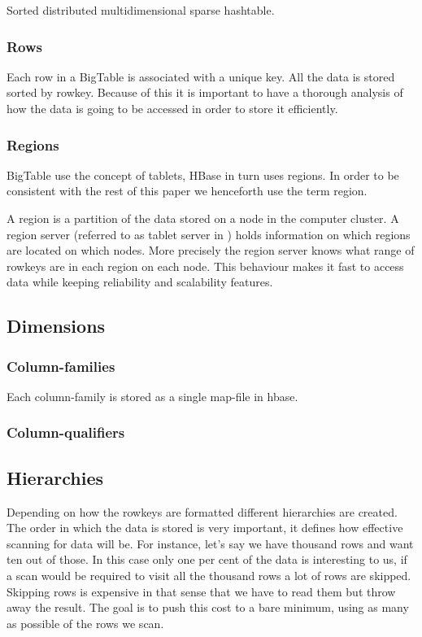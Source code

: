 \documentclass[a4paper,10pt]{book}
\begin{document}
Sorted distributed multidimensional sparse hashtable.


\subsubsection{Rows}

Each row in a BigTable is associated with a unique key. All the data is
stored sorted by rowkey. Because of this it is important to have a thorough
analysis of how the data is going to be accessed in order to store it
efficiently.



\subsubsection{Regions}

BigTable use the concept of tablets, HBase in turn uses regions. In order
to be consistent with the rest of this paper we henceforth use the term
region.

A region is a partition of the data stored on a node in the computer
cluster. A region server (referred to as tablet server in \cite{bigtable})
holds information on which regions are located on which nodes. More
precisely the region server knows what range of rowkeys are in each region
on each node. This behaviour makes it fast to access data while keeping
reliability and scalability features.



\subsection{Dimensions}

\subsubsection{Column-families}

Each column-family is stored as a single map-file in hbase.


\subsubsection{Column-qualifiers}



\subsection{Hierarchies}

Depending on how the rowkeys are formatted different hierarchies are
created. The order in which the data is stored is very important, it
defines how effective scanning for data will be. For instance, let's say we
have thousand rows and want ten out of those. In this case only one per
cent of the data is interesting to us, if a scan would be required to visit
all the thousand rows a lot of rows are skipped. Skipping rows is expensive
in that sense that we have to read them but throw away the result. The goal
is to push this cost to a bare minimum, using as many as possible of the
rows we scan.
\end{document}
